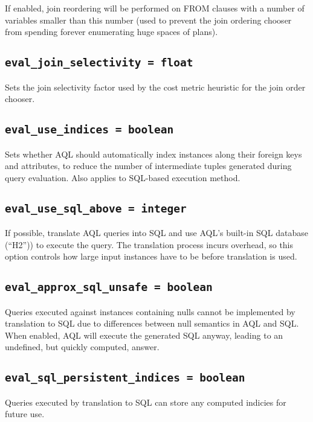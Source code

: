 \documentclass[10pt]{book}
\begin{document}
If enabled, join reordering will be performed on FROM clauses with a number of variables smaller than this number (used to prevent the join ordering chooser from spending forever enumerating huge spaces of plans).

\subsection{{\tt eval\_join\_selectivity = float}}

Sets the join selectivity factor used by the cost metric heuristic for the join order chooser.

\subsection{{\tt eval\_use\_indices = boolean}}
			
Sets whether AQL should automatically index instances along their foreign keys and attributes, to reduce the number of intermediate tuples generated during query evaluation.
Also applies to SQL-based execution method.

\subsection{{\tt eval\_use\_sql\_above = integer}}

If possible, translate AQL queries into SQL and use AQL's built-in SQL database (``H2'')) to execute the query.  The translation process incurs overhead, so this option controls how large input instances have to be before translation is used.

\subsection{{\tt eval\_approx\_sql\_unsafe = boolean}}

Queries executed against instances containing nulls cannot be implemented by translation to SQL due to differences between null semantics in AQL and SQL.  
When enabled, AQL will execute the generated SQL anyway, leading to an undefined, but quickly computed, answer.  

\subsection{{\tt eval\_sql\_persistent\_indices = boolean}}

Queries executed by translation to SQL can store any computed indicies for future use. 
\end{document}
